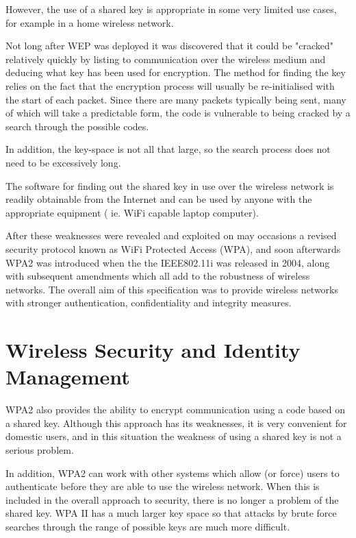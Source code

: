 However, the use of a shared key is appropriate in some very limited
use cases, for example in a home wireless network.

Not long after WEP was deployed it was discovered that it could be
"cracked" relatively quickly by listing to communication over the wireless
medium and deducing what key has been used for encryption. The method
for finding the key relies on the fact that the encryption process will
usually be re-initialised with the start of each packet. Since there are
many packets typically being sent, many of which will take a predictable
form, the code is vulnerable to being cracked by a search through the
possible codes.

In addition, the key-space is not all that large, so the search process
does not need to be excessively long.

The software for finding out the shared key in use over the wireless
network is readily obtainable from the Internet and can be used by anyone
with the appropriate equipment ( ie. WiFi capable laptop computer).

After these weaknesses were revealed and exploited on may occasions a
revised security protocol known as WiFi Protected Access (WPA), and soon
afterwards WPA2 was introduced when the the IEEE802.11i was released in
2004, along with subsequent amendments which all add to the robustness of
wireless networks. The overall aim of this specification was to provide
wireless networks with stronger authentication, confidentiality and
integrity measures.


\section{Wireless Security and Identity Management}


WPA2 also provides the ability to encrypt communication using a code
based on a shared key. Although this approach has its weaknesses, it is
very convenient for domestic users, and in this situation the weakness
of using a shared key is not a serious problem.

In addition, WPA2 can work with other systems which allow (or force) users
to authenticate before they are able to use the wireless network. When
this is included in the overall approach to security, there is no longer
a problem of the shared key. WPA II has a much larger key space so that
attacks by brute force searches through the range of possible keys are
much more difficult.

